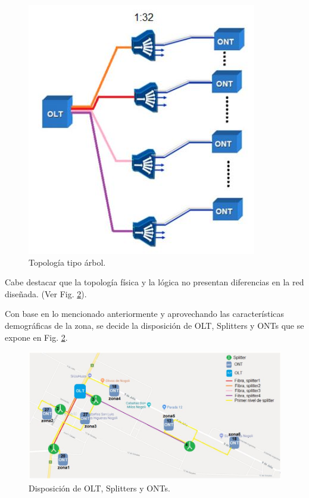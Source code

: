 \documentclass[12pt,a4paper]{book}
\begin{document}
\begin{figure}[H]
\centering
\includegraphics[width = 8 cm]{../figuras/Topologia_Arbol.jpg}
\caption{Topología tipo árbol.}
\label{fig_Topologia_Arbol_acc}
\end{figure} \medskip

Cabe destacar que la topología física y la lógica no presentan diferencias en
la red diseñada. (Ver Fig. \ref{fig_disposicion_equipos_acc}). 

\medskip

Con base en lo mencionado anteriormente y aprovechando las
características demográficas de la zona, se decide la disposición de OLT,
Splitters y ONTs que se expone en Fig. \ref{fig_disposicion_equipos_acc}.


\begin{figure}[H]
\centering
\includegraphics[width = 15 cm]{../figuras/OLTs_ONTs_Split_disposicion.jpg}
\caption{Disposición de OLT, Splitters y ONTs.}
\label{fig_disposicion_equipos_acc}
\end{figure} 

\medskip
\end{document}
